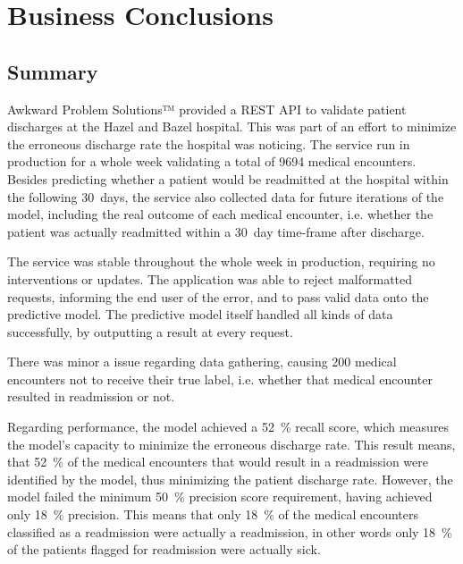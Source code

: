 \documentclass[a4paper,11pt]{article}
\begin{document}


\tableofcontents
\newpage

\section{Business Conclusions}
\subsection{Summary}


Awkward Problem Solutions™ provided a REST API to validate patient discharges at the Hazel and Bazel hospital. This was part of an effort to minimize the erroneous discharge rate the hospital was noticing.
The service run in production for a whole week validating a total of \SI{9694}{} medical encounters.
Besides predicting whether a patient would be readmitted at the hospital within the following \SI{30}{days}, the service also collected data for future iterations of the model, including the real outcome of each medical encounter, i.e. whether the patient was actually readmitted within a \SI{30}{day} time-frame after discharge.


The service was stable throughout the whole week in production, requiring no interventions or updates. The application was able to reject malformatted requests, informing the end user of the error, and to pass valid data onto the predictive model. The predictive model itself handled all kinds of data successfully, by outputting a result at every request.

There was minor a issue  regarding data gathering, causing \SI{200}{} medical encounters not to receive their true label, i.e. whether that medical encounter resulted in readmission or not. 



Regarding performance, the model achieved a \SI{52}{\percent} recall score, which measures the model's capacity to minimize the erroneous discharge rate. This result means, that \SI{52}{\percent} of the medical encounters that would result in a readmission were identified by the model, thus minimizing the patient discharge rate. 
However, the model failed the minimum \SI{50}{\percent} precision score requirement, having achieved only \SI{18}{\percent} precision. This means that only \SI{18}{\percent} of the medical encounters classified as a readmission were actually a readmission, in other words only \SI{18}{\percent} of the patients flagged for readmission were actually sick. %
\end{document}
